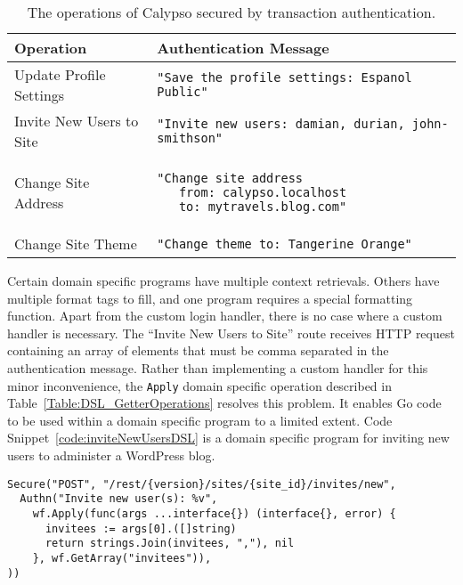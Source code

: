 \begin{table}[h]
\centering

\begin{tabular}{ m{5cm} m{9cm}  } 
 \hline
 Operation & Authentication Message \\ 
 \hline \hline

 Update Profile Settings & \lstinline|"Save the profile settings: Espanol Public"| \\ \hline

 Invite New Users to Site & \lstinline|"Invite new users: damian, durian, john-smithson"| \\ \hline

 Change Site Address & 
 \begin{lstlisting} 
"Change site address
   from: calypso.localhost
   to: mytravels.blog.com"
\end{lstlisting} 
\\ \hline

 Change Site Theme & \lstinline|"Change theme to: Tangerine Orange"| \\ \hline

\end{tabular}
\caption{The operations of Calypso secured by transaction authentication.}
\label{Table:CalypsoSecuredRoutes}
\end{table}

Certain domain specific programs have multiple context retrievals. Others have multiple format tags to fill, and one program requires a special formatting function. Apart from the custom login handler, there is no case where a custom handler is necessary. 
The ``Invite New Users to Site'' route receives HTTP request containing an array of elements that must be comma separated in the authentication message. Rather than implementing a custom handler for this minor inconvenience, the \lstinline{Apply} domain specific operation described in Table~\ref{Table:DSL_GetterOperations} resolves this problem. It enables Go code to be used within a domain specific program to a limited extent. Code Snippet~\ref{code:inviteNewUsersDSL} is a domain specific program for inviting new users to administer a WordPress blog.


\begin{lstlisting}[float=h,label=code:inviteNewUsersDSL,caption=A domain specific program to secure the Calypso operation for inviting new users to administer a WordPress blog.]
Secure("POST", "/rest/{version}/sites/{site_id}/invites/new", 
  Authn("Invite new user(s): %v",
    wf.Apply(func(args ...interface{}) (interface{}, error) {
      invitees := args[0].([]string)
      return strings.Join(invitees, ","), nil
    }, wf.GetArray("invitees")),
))
\end{lstlisting}


